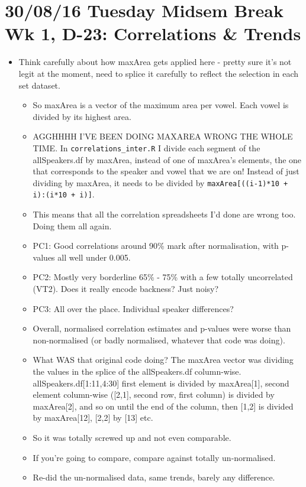\documentclass{article}
\begin{document}
\section*{30/08/16 Tuesday Midsem Break Wk 1, D-23: Correlations \& Trends}
\begin{itemize}
    \item Think carefully about how maxArea gets applied here - pretty sure it's not legit at the moment, need to splice it carefully to reflect the selection in each set dataset.
    \begin{itemize}
        \item So maxArea is a vector of the maximum area per vowel. Each vowel is divided by its highest area.
        \item AGGHHHH I'VE BEEN DOING MAXAREA WRONG THE WHOLE TIME. In \verb|correlations_inter.R| I divide each segment of the allSpeakers.df by maxArea, instead of one of maxArea's elements, the one that corresponds to the speaker and vowel that we are on! Instead of just dividing by maxArea, it needs to be divided by \verb|maxArea[((i-1)*10 + i):(i*10 + i)]|.
        \item This means that all the correlation spreadsheets I'd done are wrong too. Doing them all again.
        \item PC1: Good correlations around 90\% mark after normalisation, with p-values all well under 0.005. 
        \item PC2: Mostly very borderline 65\% - 75\% with a few totally uncorrelated (VT2). Does it really encode backness? Just noisy?
        \item PC3: All over the place. Individual speaker differences?
        \item Overall, normalised correlation estimates and p-values were worse than non-normalised (or badly normalised, whatever that code was doing).
        \item What WAS that original code doing? The maxArea vector was dividing the values in the splice of the allSpeakers.df column-wise. allSpeakers.df[1:11,4:30] first element is divided by maxArea[1], second element column-wise ([2,1], second row, first column) is divided by maxArea[2], and so on until the end of the column, then [1,2] is divided by maxArea[12], [2,2] by [13] etc.
        \item So it was totally screwed up and not even comparable.
        \item If you're going to compare, compare against totally un-normalised.
        \item Re-did the un-normalised data, same trends, barely any difference.

\end{itemize}
\end{itemize}
\end{document}
